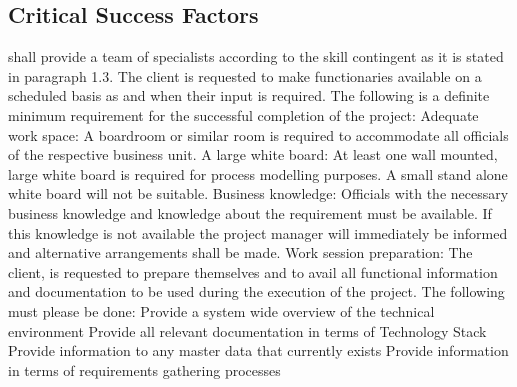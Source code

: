 \subsection{Critical Success Factors}
\vendor shall provide a team of specialists according to the skill contingent as it is stated in paragraph 1.3.  The client \client is requested to make functionaries available on a scheduled basis as and when their input is required.  The following is a definite minimum requirement for the successful completion of the project:
\slist
\spit Adequate work space:  A boardroom or similar room is required to accommodate all officials of the respective \vendor business unit.  
\spit A large white board:  At least one wall mounted, large white board is required for process modelling purposes.  A small stand alone white board will not be suitable.
\spit Business knowledge:  Officials with the necessary business knowledge and knowledge about the requirement must be available.  If this knowledge is not available the \client project manager will immediately be informed and alternative arrangements shall be made.
\spit Work session preparation: The client, \client is requested to prepare themselves and to avail all functional information and documentation to be used during the execution of the project.  The following must please be done:
\slist
\spit Provide a system wide overview of the technical environment
\spit Provide all relevant documentation in terms of Technology Stack
\spit Provide information to any master data that currently exists
\spit Provide information in terms of requirements gathering processes

